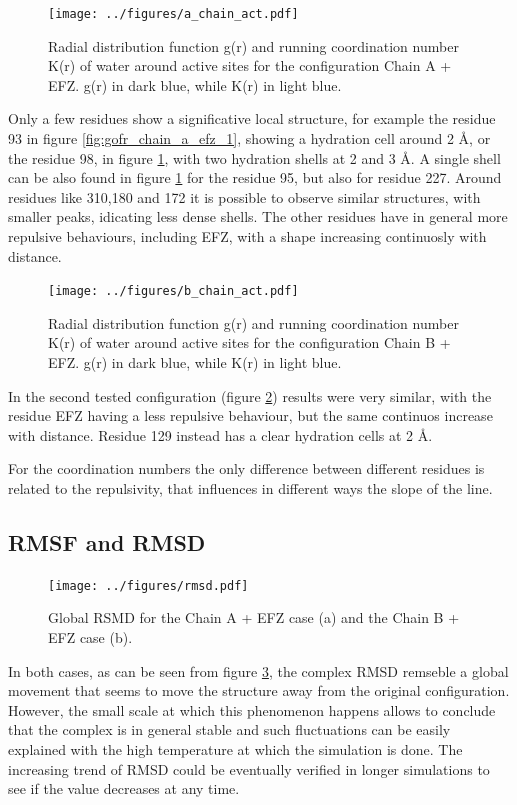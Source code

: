 \documentclass[12pt]{article}
\begin{document}
\begin{figure}
    \centering
    \texttt{[image: ../figures/a\_chain\_act.pdf]}
    \caption{Radial distribution function g(r) and running coordination number K(r) of water around active sites for the configuration Chain A + EFZ. g(r) in dark blue, while K(r) in light blue.\label{fig:gofr_chain_a_efz_2}}
\end{figure}
Only a few residues show a significative local structure, for example the residue 93 in figure \ref{fig:gofr_chain_a_efz_1}, showing a hydration cell around
2 \AA, or the residue 98, in figure \ref{fig:gofr_chain_a_efz_2}, with two hydration shells at 2 and 3 \AA. A single shell can be also found in figure \ref{fig:gofr_chain_a_efz_2} for the residue 95, but also for residue 227.
Around residues like 310,180 and 172 it is possible to observe similar structures, with smaller peaks, idicating less dense shells. The other residues have in general more repulsive behaviours, including EFZ, with a shape increasing continuosly with distance.

\begin{figure}[H]
    \centering
    \texttt{[image: ../figures/b\_chain\_act.pdf]}
    \caption{Radial distribution function g(r) and running coordination number K(r) of water around active sites for the configuration Chain B + EFZ. g(r) in dark blue, while K(r) in light blue.\label{fig:gofr_chain_b_efz}}
\end{figure}

In the second tested configuration (figure \ref{fig:gofr_chain_b_efz}) results were very similar, with the residue EFZ having a less repulsive behaviour, but the same continuos increase with distance. Residue 129 instead has a clear hydration cells at 2 \AA.

For the coordination numbers the only difference between different residues is related to the repulsivity, that influences in different ways the slope of the line.

\subsection{RMSF and RMSD}
\begin{figure}[H]
    \centering
    \texttt{[image: ../figures/rmsd.pdf]}
    \caption{Global RSMD for the Chain A + EFZ case (a) and the Chain B + EFZ case (b).\label{fig:rmsd}}
\end{figure}
In both cases, as can be seen from figure \ref{fig:rmsd}, the complex RMSD remseble a global movement that seems to move the structure away from the original configuration. However, the small scale at which this phenomenon happens allows to conclude that the complex is in general stable and such fluctuations can be easily explained with the high temperature at which the simulation is done. The increasing trend of RMSD could be eventually verified in longer simulations to see if the value decreases at any time.
\end{document}
